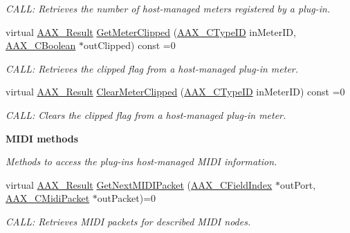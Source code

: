 \begin{Indent}
\begin{DoxyCompactItemize}
\begin{DoxyCompactList}\small\item\em C\+A\+LL\+: Retrieves the number of host-\/managed meters registered by a plug-\/in. \end{DoxyCompactList}\item 
virtual \mbox{\hyperlink{a00392_a4d8f69a697df7f70c3a8e9b8ee130d2f}{A\+A\+X\+\_\+\+Result}} \mbox{\hyperlink{a01789_a1f07fa44cd8b3c4fddee9c0b78d35bbd}{Get\+Meter\+Clipped}} (\mbox{\hyperlink{a00392_ac678f9c1fbcc26315d209f71a147a175}{A\+A\+X\+\_\+\+C\+Type\+ID}} in\+Meter\+ID, \mbox{\hyperlink{a00392_aa216506530f1d19a2965931ced2b274b}{A\+A\+X\+\_\+\+C\+Boolean}} $\ast$out\+Clipped) const =0
\begin{DoxyCompactList}\small\item\em C\+A\+LL\+: Retrieves the clipped flag from a host-\/managed plug-\/in meter. \end{DoxyCompactList}\item 
virtual \mbox{\hyperlink{a00392_a4d8f69a697df7f70c3a8e9b8ee130d2f}{A\+A\+X\+\_\+\+Result}} \mbox{\hyperlink{a01789_a2c989b51cd74e0ce0319baf6d1c82465}{Clear\+Meter\+Clipped}} (\mbox{\hyperlink{a00392_ac678f9c1fbcc26315d209f71a147a175}{A\+A\+X\+\_\+\+C\+Type\+ID}} in\+Meter\+ID) const =0
\begin{DoxyCompactList}\small\item\em C\+A\+LL\+: Clears the clipped flag from a host-\/managed plug-\/in meter. \end{DoxyCompactList}\end{DoxyCompactItemize}
\end{Indent}
\begin{Indent}\textbf{ M\+I\+DI methods}\par
{\em Methods to access the plug-\/in\textquotesingle{}s host-\/managed M\+I\+DI information. }\begin{DoxyCompactItemize}
\item 
virtual \mbox{\hyperlink{a00392_a4d8f69a697df7f70c3a8e9b8ee130d2f}{A\+A\+X\+\_\+\+Result}} \mbox{\hyperlink{a01789_a2896ba3a1ed86ce2813b1736d316d275}{Get\+Next\+M\+I\+D\+I\+Packet}} (\mbox{\hyperlink{a00392_ae807f8986143820cfb5d6da32165c9c7}{A\+A\+X\+\_\+\+C\+Field\+Index}} $\ast$out\+Port, \mbox{\hyperlink{a01429}{A\+A\+X\+\_\+\+C\+Midi\+Packet}} $\ast$out\+Packet)=0
\begin{DoxyCompactList}\small\item\em C\+A\+LL\+: Retrieves M\+I\+DI packets for described M\+I\+DI nodes. \end{DoxyCompactList}\end{DoxyCompactItemize}
\end{Indent}


